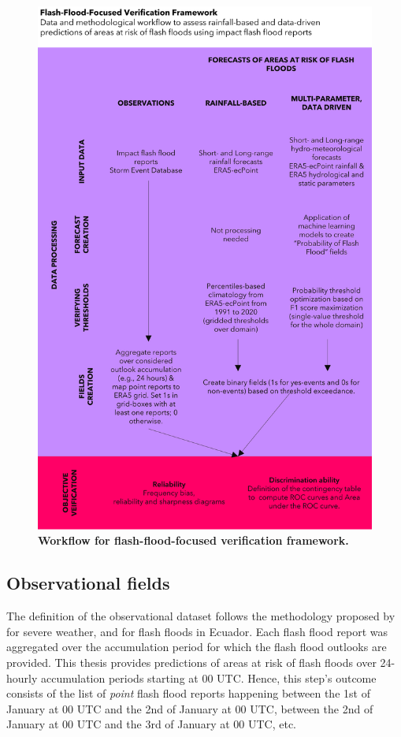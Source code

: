 \begin{figure}[htbp]
\centering
\includegraphics[width=\textwidth]{workflow_verif_framework.png}
\caption{\textbf{Workflow for flash-flood-focused verification framework.}}
\label{fig:sed_reports}
\end{figure}


\subsection{Observational fields}
\label{obs_field}
The definition of the observational dataset follows the methodology proposed by \citep{Tsonevsky_2018} for severe weather, and \citep{Pillosu_2024} for flash floods in Ecuador. Each flash flood report was aggregated over the accumulation period for which the flash flood outlooks are provided. This thesis provides predictions of areas at risk of flash floods over 24-hourly accumulation periods starting at 00 UTC. Hence, this step's outcome consists of the list of \textit{point} flash flood reports happening between the 1st of January at 00 UTC and the 2nd of January at 00 UTC, between the 2nd of January at 00 UTC and the 3rd of January at 00 UTC, etc. 

